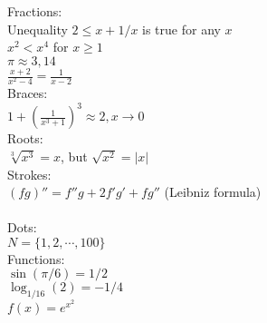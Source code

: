 \documentclass[12pt]{letter}
\begin{document}
\Large{
Fractions: \\
Unequality $2\le x+1/x$ is true for any $x$ \\
$x^2 < x^4$ for $x\ge1$ \\
$\pi\approx3,14$ \\
$\frac{x+2}{x^2-4} = \frac{1}{x-2}$
\\

Braces: \\
$1 + \left( \frac{1}{x^3 + 1} \right)^3 \approx 2, x\to0$
\\

Roots: \\
$\sqrt[3]{x^3}=x$, but $\sqrt{x^2}=|x|$
\\

Strokes: \\
$(fg)'' = f''g + 2f'g' + fg''$ (Leibniz formula) \\
\\ 

Dots: \\
$N = \{1,2,\cdots,100\}$ \\

Functions: \\
$\sin(\pi/6) = 1/2$ \\
$\log_{1/16}(2) = -1/4$ \\
$f(x) = e^{x^2}$
















}
\end{document}
